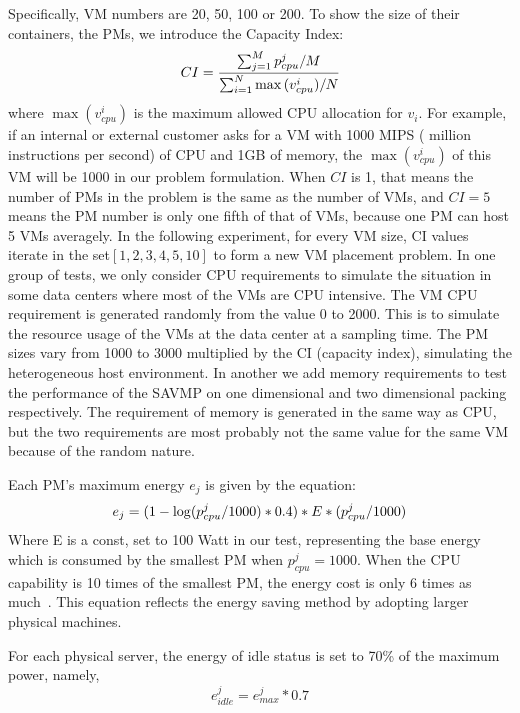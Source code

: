 \documentclass[10pt, conference, compsocconf]{IEEEtran}
\begin{document}
Specifically, VM numbers are 20, 50, 100 or 200. 
To show the size of their containers, the PMs, we introduce the Capacity
Index:
\begin{equation}\label{12}
CI=\frac{\sum_{j=1}^Mp_{cpu}^j / M}{\sum_{i=1}^N\max{(v_{cpu}^i)} / N} \\
\end{equation}
where $\max{(v_{cpu}^i)}$ is the maximum allowed CPU allocation for $v_i$. For
example, if an internal or external customer asks for a VM with 1000 MIPS (
million instructions per second) of CPU and 1GB of memory, the $\max{(v_{cpu}^i)}$ of
this VM will be 1000 in our problem formulation. When $CI$ is 1, that means the
number of PMs in the problem is the same as the number of VMs, and $CI=5$ means
the PM number is only one fifth of that of VMs, because one PM can host 5 VMs
averagely.
In the following experiment, for every VM size, CI values iterate in the set$
[1, 2, 3, 4, 5, 10]$ to form a new VM placement problem.
In one group of tests, we only consider CPU requirements to simulate the
situation in some data centers where most of the VMs are CPU intensive.
The VM CPU requirement is generated randomly from the value 0 to 2000. This is
to simulate the resource usage of the VMs at the data center at a sampling time.
The PM sizes vary from 1000 to 3000 multiplied by the CI (capacity index),
simulating the heterogeneous host environment. In another we add memory
requirements to test the performance of the SAVMP on one dimensional and two
dimensional packing respectively. The requirement of memory is generated in the
same way as CPU, but the two requirements are most probably not the same value
for the same VM because of the random nature.

Each PM's maximum energy $e_j$ is given by the equation:
\begin{equation}\label{13}
e_j=(1-\log (p_{cpu}^j/1000)*0.4)*E*(p_{cpu}^j/1000) \\
\end{equation}
Where E is a const, set to 100 Watt in our test, representing the base energy
which is consumed by the smallest PM when $p_{cpu}^j=1000$. When the CPU
capability is 10 times of the smallest PM, the energy cost is only 6 times as
much~\cite{Meikel08}. This equation reflects the energy saving method by
adopting larger physical machines.

For each physical server, the energy of idle status is set to 70\% of the
 maximum power, namely,
 \begin{equation}\label{14}
e_{idle}^j= e_{max}^j*0.7
\end{equation}
\end{document}
